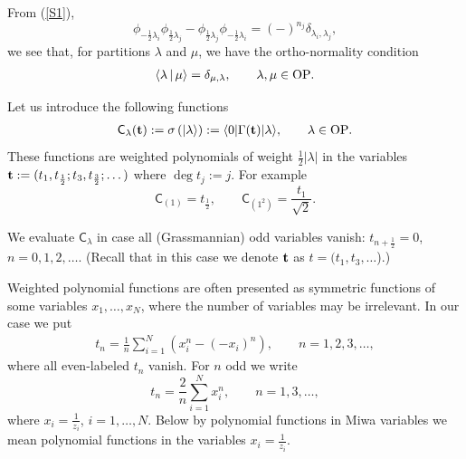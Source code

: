 \documentclass[pdftex]{sigma}
\numberwithin{equation}{section}
\newcommand{\C}{\textsf{C}_}
\newcommand{\G}{\Gamma}
\newcommand{\bt}{{\bf {t}}}
\renewcommand{\l}{\langle}
\renewcommand{\r}{\rangle}
\begin{document}
From (\ref{S1}),
 \[
\phi_{-\frac 12\lambda_i}\phi_{\frac 12\lambda_j}-\phi_{\frac12
\lambda_j}\phi_{-\frac
12\lambda_i}=(-)^{n_j}\delta_{\lambda_i,\lambda_j},
 \]
 we see that, for partitions $\lambda$ and $\mu$,
we have the ortho-normality condition
\begin{gather}\label{orto}
\l\lambda \,|\,\mu \r = \delta_{\mu,\lambda}  ,\qquad \lambda, \mu \in
\rm OP.
\end{gather}

Let us introduce the following functions
 \begin{gather}\label{C-lambda}
\textsf{C}_\lambda(\bt):= \sigma\left(|\lambda\r  \right):= \l
0|\G(\bt)|\lambda\r ,\qquad \lambda\in \rm OP.
 \end{gather}
 These functions are weighted polynomials of weight $\frac 12|\lambda|$ in
 the variables
 $\bt:=(t_1,t_{\frac 12};t_3,t_{\frac 32};\dots)$  where $\deg t_j
 :=j $. For example
  \[
\C{(1)}=t_{\frac 12} ,\qquad \C{(1^2)}=\frac{t_1}{\sqrt{2}} .
  \]

 We evaluate $\textsf{C}_\lambda$ in case all (Grassmannian) odd variables vanish:
 $t_{n+\frac 12}=0$, $n=0,1,2,\dots$. (Recall that in this case we denote $\bt$ as
 $t=(t_1,t_3,\dots$).)


\begin{remark}\label{polynomials} Weighted polynomial functions are often
presented as symmetric functions of some variables
$x_1,\dots,x_N$, where the number of variables may be irrelevant.
In our case we put
 \begin{gather}\label{miwa}
t_{n} = \frac 1{n} \sum_{i=1}^N
\left(x_i^{n}-(-x_i)^{n}\right) ,\qquad n=1,2,3,\dots,
 \end{gather}
 where all even-labeled $t_n$ vanish. For $n$ odd we write
\[
t_{n} = \frac 2{n} \sum_{i=1}^N  x_i^{n} ,\qquad n=1,3,\dots,
\]
 where $x_i=\frac 1{z_i}$, $i=1,\dots,N$. Below by polynomial
 functions in Miwa variables we mean polynomial functions in the
 variables $x_i=\frac 1{z_i}$.
\end{remark}
\end{document}
